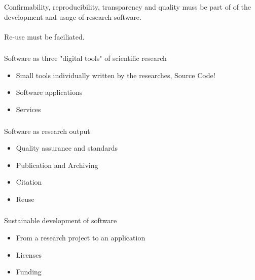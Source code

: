\documentclass{beamer}
\begin{document}
\begin{frame}
  \frametitle{}
  \begin{block}{}
    \begin{center}    
      Confirmability, reproducibility, transparency and quality muss be
      part of of the development and usage of research software.\\
      \ \\
      Re-use must be faciliated.
      \end{center}       
  \end{block}
\end{frame}

\begin{frame}
  \frametitle{}
  \begin{block}{}
    \begin{center}
      Software as three "digital tools" of scientific research
      \begin{itemize}
      \item Small tools individually written by the researches, Source Code!
      \item Software applications
      \item Services
      \end{itemize}
    \end{center}
  \end{block}
\end{frame}

\begin{frame}
  \frametitle{}
  \begin{block}{}
    \begin{center}
      Software as research output
      \begin{itemize}
      \item Quality assurance and standards
      \item Publication and Archiving
      \item Citation
      \item Reuse
      \end{itemize}
    \end{center}
  \end{block}
\end{frame}

\begin{frame}
  \frametitle{}
  \begin{block}{}
    \begin{center}
      Sustainable development of software
      \begin{itemize}
      \item From a research project to an application
      \item Licenses
      \item Funding
      \end{itemize}
    \end{center}
  \end{block}
\end{frame}
\end{document}
